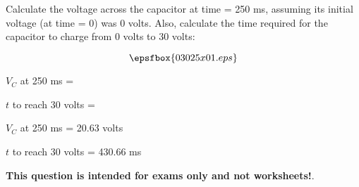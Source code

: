 

Calculate the voltage across the capacitor at time = 250 ms, assuming its initial voltage (at time = 0) was 0 volts.  Also, calculate the time required for the capacitor to charge from 0 volts to 30 volts:

$$\epsfbox{03025x01.eps}$$

$V_C$ at 250 ms = 

\vskip 10pt

$t$ to reach 30 volts = 







$V_C$ at 250 ms = 20.63 volts

\vskip 10pt

$t$ to reach 30 volts = 430.66 ms







{\bf This question is intended for exams only and not worksheets!}.




